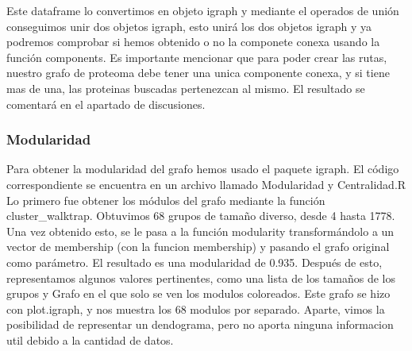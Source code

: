 Este dataframe lo convertimos en objeto igraph y mediante el operados de unión conseguimos unir dos objetos igraph, esto unirá los dos objetos igraph y ya podremos comprobar si hemos obtenido o no la componete conexa usando la función components. Es importante mencionar que para poder crear las rutas, nuestro grafo de proteoma debe tener una unica componente conexa, y si tiene mas de una, las proteinas buscadas pertenezcan al mismo. El resultado se comentará en el apartado de discusiones. 

\subsubsection{Modularidad}

Para obtener la modularidad del grafo hemos usado el paquete igraph. El código correspondiente se encuentra en un archivo llamado Modularidad y Centralidad.R
Lo primero fue obtener los módulos del grafo mediante la función cluster_walktrap. Obtuvimos 68 grupos de tamaño diverso, desde 4 hasta 1778. Una vez obtenido esto, se le pasa a la función modularity transformándolo a un vector de membership (con la funcion membership) y pasando el grafo original como parámetro. El resultado es una modularidad de 0.935.
Después de esto, representamos algunos valores pertinentes, como una lista de los tamaños de los grupos y Grafo en el que solo se ven los modulos coloreados.
Este grafo se hizo con plot.igraph, y nos muestra los 68 modulos por separado.
Aparte, vimos la posibilidad de representar un dendograma, pero no aporta ninguna informacion util debido a la cantidad de datos.




